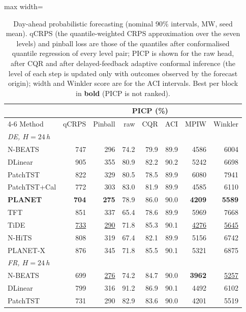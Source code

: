 \begin{table}[!t]
\centering
\caption{Day-ahead probabilistic forecasting (nominal 90\% intervals, MW, seed mean). qCRPS (the quantile-weighted CRPS approximation over the seven levels) and pinball loss are those of the quantiles after conformalised quantile regression of every level pair; PICP is shown for the raw head, after CQR and after delayed-feedback adaptive conformal inference (the level of each step is updated only with outcomes observed by the forecast origin); width and Winkler score are for the ACI intervals. Best per block in \textbf{bold} (PICP is not ranked).}
\label{tab:prob-v2}
\setlength{\tabcolsep}{3pt}\footnotesize
\begin{adjustbox}{max width=\linewidth}
\begin{tabular}{lrrrrrrr}
\toprule
 & & & \multicolumn{3}{c}{PICP (\%)} & & \\
\cmidrule(lr){4-6}
Method & qCRPS & Pinball & raw & CQR & ACI & MPIW & Winkler \\
\midrule
\multicolumn{8}{l}{\textit{DE, $H=24$\,h}} \\
\quad N-BEATS & 747 & 296 & 74.2 & 79.9 & 89.9 & 4586 & 6004 \\
\quad DLinear & 905 & 355 & 80.9 & 82.2 & 90.2 & 5242 & 6698 \\
\quad PatchTST & 822 & 329 & 80.5 & 78.5 & 89.9 & 6080 & 7941 \\
\quad PatchTST+Cal & 772 & 303 & 83.0 & 81.9 & 89.9 & 4585 & 6110 \\
\quad \textbf{PLANET} & \textbf{704} & \textbf{275} & 78.9 & 86.0 & 90.0 & \textbf{4209} & \textbf{5589} \\
\quad TFT & 851 & 337 & 65.4 & 78.6 & 89.9 & 5969 & 7668 \\
\quad TiDE & \underline{733} & \underline{290} & 71.8 & 85.3 & 90.1 & \underline{4276} & \underline{5645} \\
\quad N-HiTS & 808 & 319 & 67.4 & 82.1 & 89.9 & 5156 & 6742 \\
\quad PLANET-X & 876 & 345 & 71.8 & 85.5 & 90.1 & 5321 & 6875 \\
\midrule
\multicolumn{8}{l}{\textit{FR, $H=24$\,h}} \\
\quad N-BEATS & 699 & \underline{276} & 74.2 & 84.7 & 90.0 & \textbf{3962} & \underline{5257} \\
\quad DLinear & 799 & 316 & 91.2 & 86.9 & 90.1 & 4492 & 6102 \\
\quad PatchTST & 731 & 290 & 82.9 & 83.6 & 90.0 & 4201 & 5519 \\

\end{tabular}
\end{adjustbox}
\end{table}
